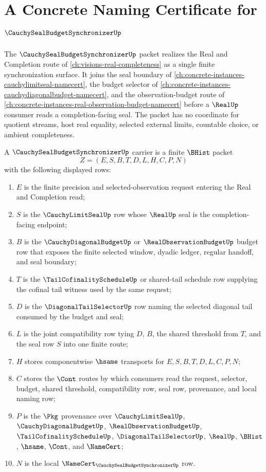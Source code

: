 \chapter{A Concrete Naming Certificate for $\CauchySealBudgetSynchronizerUp$}
\label{ch:concrete-instances-cauchy-seal-budget-synchronizer-namecert}

The $\CauchySealBudgetSynchronizerUp$ packet realizes the Real and Completion route of \autoref{ch:visions-real-completeness} as a single finite synchronization surface. It joins the seal boundary of \autoref{ch:concrete-instances-cauchylimitseal-namecert}, the budget selector of \autoref{ch:concrete-instances-cauchydiagonalbudget-namecert}, and the observation-budget route of \autoref{ch:concrete-instances-real-observation-budget-namecert} before a $\RealUp$ consumer reads a completion-facing seal. The packet has no coordinate for quotient streams, host real equality, selected external limits, countable choice, or ambient completeness.

\begin{definition}
\label{def:cauchy-seal-budget-synchronizer-carrier}
A $\CauchySealBudgetSynchronizerUp$ carrier is a finite $\BHist$ packet
$$
Z=(E,S,B,T,D,L,H,C,P,N)
$$
with the following displayed rows:
\begin{enumerate}
\item $E$ is the finite precision and selected-observation request entering the Real and Completion read;
\item $S$ is the $\CauchyLimitSealUp$ row whose $\RealUp$ seal is the completion-facing endpoint;
\item $B$ is the $\CauchyDiagonalBudgetUp$ or $\RealObservationBudgetUp$ budget row that exposes the finite selected window, dyadic ledger, regular handoff, and seal boundary;
\item $T$ is the $\TailCofinalityScheduleUp$ or shared-tail schedule row supplying the cofinal tail witness used by the same request;
\item $D$ is the $\DiagonalTailSelectorUp$ row naming the selected diagonal tail consumed by the budget and seal;
\item $L$ is the joint compatibility row tying $D$, $B$, the shared threshold from $T$, and the seal row $S$ into one finite route;
\item $H$ stores componentwise $\hsame$ transports for $E,S,B,T,D,L,C,P,N$;
\item $C$ stores the $\Cont$ routes by which consumers read the request, selector, budget, shared threshold, compatibility row, seal row, provenance, and local naming row;
\item $P$ is the $\Pkg$ provenance over $\CauchyLimitSealUp$, $\CauchyDiagonalBudgetUp$, $\RealObservationBudgetUp$, $\TailCofinalityScheduleUp$, $\DiagonalTailSelectorUp$, $\RealUp$, $\BHist$, $\hsame$, $\Cont$, and $\NameCert$;
\item $N$ is the local $\NameCert_{\CauchySealBudgetSynchronizerUp}$ row.
\end{enumerate}
\end{definition}

